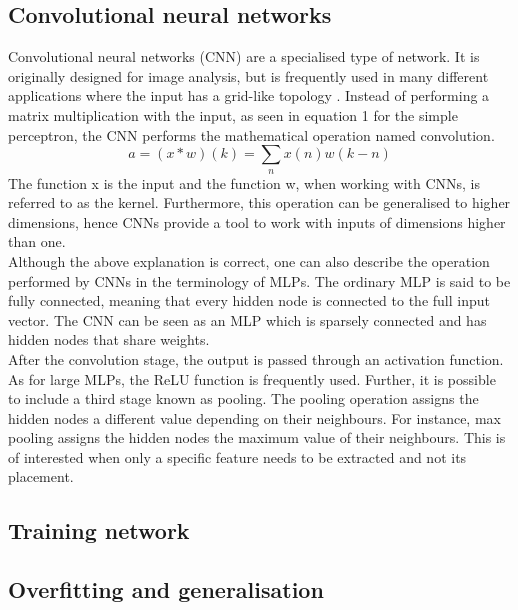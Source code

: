 \documentclass{article}
\begin{document}
\subsection{Convolutional neural networks}
Convolutional neural networks (CNN) are a specialised type of network. It is originally designed for image analysis, but is frequently used in many different applications where the input has a grid-like topology \cite{Deeplearningbook}. Instead of performing a matrix multiplication with the input, as seen in equation 1 for the simple perceptron, the CNN performs the mathematical operation named convolution.
\begin{equation}
    a=(x\ast w)(k)=\sum_{n}x(n)w(k-n)
\end{equation}
The function x is the input and the function w, when working with CNNs, is referred to as the kernel. Furthermore, this operation can be generalised to higher dimensions, hence CNNs provide a tool to work with inputs of dimensions higher than one.\\
Although the above explanation is correct, one can also describe the operation performed by CNNs in the terminology of MLPs. The ordinary MLP is said to be fully connected, meaning that every hidden node is connected to the full input vector. The CNN can be seen as an MLP which is sparsely connected and has hidden nodes that share weights. 
\\
After the convolution stage, the output is passed through an activation function. As for large MLPs, the ReLU function is frequently used. Further, it is possible to include a third stage known as pooling. The pooling operation assigns the hidden nodes a different value depending on their neighbours. For instance, max pooling assigns the hidden nodes the maximum value of their neighbours. This is of interested when only a specific feature needs to be extracted and not its placement.











\subsection{Training network}

\subsection{Overfitting and generalisation}

















\end{document}
